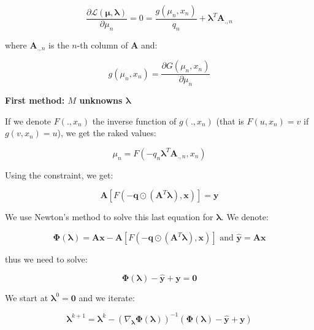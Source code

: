 \documentclass{tex/note}
\begin{document}
\begin{equation*}
\frac{\partial \mathcal{L} \left( \bm{\mu} , \bm{\lambda} \right)}{\partial \mu_n} = 0 =
\frac{g \left( \mu_n , x_n \right)}{q_n} + \bm{\lambda}^T \bm{A}_{.,n}
\end{equation*}

where $\bm{A}_{.,n}$ is the $n$-th column of $\bm{A}$ and:

\begin{equation*}
g \left( \mu_n , x_n \right) = \frac{\partial G \left( \mu_n , x_n \right)}{\partial \mu_n}
\end{equation*}

\textbf{First method: $M$ unknowns $\bm{\lambda}$}

If we denote $F \left( . , x_n \right)$ the inverse function of $g \left( . , x_n \right)$ (that is $F \left( u , x_n \right) = v$ if $ g \left( v , x_n \right) = u$), we get the raked values:

\begin{equation*}
\mu_n = F \left( - q_n \bm{\lambda}^T \bm{A}_{.,n} , x_n \right)
\end{equation*}

Using the constraint, we get:

\begin{equation*}
\bm{A} \left[ F \left( - \bm{q} \odot \left( \bm{A}^T \bm{\lambda} \right) , \bm{x} \right) \right] = \bm{y}
\end{equation*}

We use Newton’s method to solve this last equation for $\bm{\lambda}$. We denote:

\begin{equation*}
\bm{\Phi} \left( \bm{\lambda} \right) = \bm{A} \bm{x} - \bm{A} \left[ F \left( - \bm{q} \odot \left( \bm{A}^T \bm{\lambda} \right) , \bm{x} \right) \right] \text{ and } \hat{\bm{y}} = \bm{A} \bm{x}
\end{equation*}

thus we need to solve:

\begin{equation*}
\bm{\Phi} \left( \bm{\lambda} \right) - \hat{\bm{y}} + \bm{y} = \bm{0}
\end{equation*}

We start at $\bm{\lambda}^0 = \bm{0}$ and we iterate:

\begin{equation*}
\bm{\lambda}^{k + 1} = \bm{\lambda}^k - \left( \nabla_{\bm{\lambda}} \bm{\Phi} \left( \bm{\lambda} \right) \right) ^{-1} \left( \bm{\Phi} \left( \bm{\lambda} \right) - \hat{\bm{y}} + \bm{y} \right)
\end{equation*}
\end{document}
